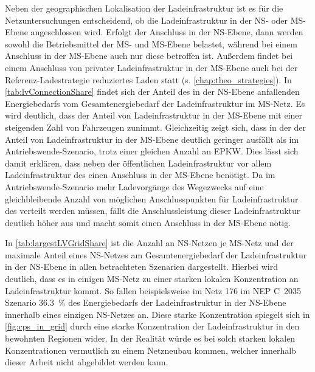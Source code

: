Neben der geographischen Lokalisation der Ladeinfrastruktur ist es für die Netzuntersuchungen entscheidend, ob die Ladeinfrastruktur in der \gls{NS}- oder \gls{MS}-Ebene angeschlossen wird.
Erfolgt der Anschluss in der \gls{NS}-Ebene, dann werden sowohl die Betriebsmittel der \gls{MS}- und \gls{MS}-Ebene belastet, während bei einem Anschluss in der \gls{MS}-Ebene auch nur diese betroffen ist.
Außerdem findet bei einem Anschluss von privater Ladeinfrastruktur in der \gls{MS}-Ebene auch bei der Referenz-Ladestrategie reduziertes Laden statt (s. \autoref{chap:theo_strategies}).
In \autoref{tab:lvConnectionShare} findet sich der Anteil des in der \gls{NS}-Ebene anfallenden Energiebedarfs vom Gesamtenergiebedarf der Ladeinfrastruktur im \gls{MS}-Netz.
Es wird deutlich, dass der Anteil von Ladeinfrastruktur in der \gls{MS}-Ebene mit einer steigenden Zahl von Fahrzeugen zunimmt.
Gleichzeitig zeigt sich, dass in der \SzeFirmenparkplatz der Anteil von Ladeinfrastruktur in der \gls{MS}-Ebene deutlich geringer ausfällt als im Antriebswende-Szenario, trotz einer gleichen Anzahl an \gls{EPKW}.
Dies lässt sich damit erklären, dass neben der öffentlichen Ladeinfrastruktur vor allem Ladeinfrastruktur des \UC \Firmeparkplatz einen Anschluss in der \gls{MS}-Ebene benötigt.
Da im Antriebswende-Szenario mehr Ladevorgänge des Wegezwecks \Arbeit auf eine gleichbleibende Anzahl von möglichen Anschlusspunkten für Ladeinfrastruktur des \UC \Firmeparkplatz verteilt werden müssen, fällt die Anschlussleistung dieser Ladeinfrastruktur deutlich höher aus und macht somit einen Anschluss in der \gls{MS}-Ebene nötig.



In \autoref{tab:largestLVGridShare} ist die Anzahl an \gls{NS}-Netzen je \gls{MS}-Netz und der maximale Anteil eines \gls{NS}-Netzes am Gesamtenergiebedarf der Ladeinfrastruktur in der \gls{NS}-Ebene in allen betrachteten Szenarien dargestellt.
Hierbei wird deutlich, dass es in einigen \gls{MS}-Netz zu einer starken lokalen Konzentration an Ladeinfrastruktur kommt.
So fallen beispielsweise im Netz \num{176} im NEP C~\num{2035} Szenario \SI{36.3}{\percent} des Energiebedarfs der Ladeinfrastruktur in der \gls{NS}-Ebene innerhalb eines einzigen \gls{NS}-Netzes an.
Diese starke Konzentration spiegelt sich in \autoref{fig:cps_in_grid} durch eine starke Konzentration der Ladeinfrastruktur in den bewohnten Regionen wider.
In der Realität würde es bei solch starken lokalen Konzentrationen vermutlich zu einem Netzneubau kommen, welcher innerhalb dieser Arbeit nicht abgebildet werden kann.

